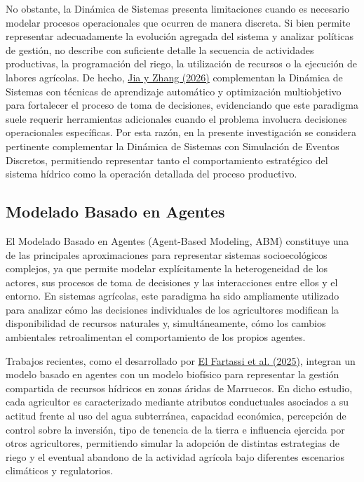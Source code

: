 \documentclass[12pt]{report}
\newcommand{\citeref}[2]{\hyperlink{ref:#1}{#2}}
\begin{document}
No obstante, la Dinámica de Sistemas presenta limitaciones cuando es necesario modelar procesos operacionales que ocurren de manera discreta. Si bien permite representar adecuadamente la evolución agregada del sistema y analizar políticas de gestión, no describe con suficiente detalle la secuencia de actividades productivas, la programación del riego, la utilización de recursos o la ejecución de labores agrícolas. De hecho, \citeref{jia2026}{Jia y Zhang (2026)} complementan la Dinámica de Sistemas con técnicas de aprendizaje automático y optimización multiobjetivo para fortalecer el proceso de toma de decisiones, evidenciando que este paradigma suele requerir herramientas adicionales cuando el problema involucra decisiones operacionales específicas. Por esta razón, en la presente investigación se considera pertinente complementar la Dinámica de Sistemas con Simulación de Eventos Discretos, permitiendo representar tanto el comportamiento estratégico del sistema hídrico como la operación detallada del proceso productivo.

\subsection{Modelado Basado en Agentes}

El Modelado Basado en Agentes (Agent-Based Modeling, ABM) constituye una de las principales aproximaciones para representar sistemas socioecológicos complejos, ya que permite modelar explícitamente la heterogeneidad de los actores, sus procesos de toma de decisiones y las interacciones entre ellos y el entorno. En sistemas agrícolas, este paradigma ha sido ampliamente utilizado para analizar cómo las decisiones individuales de los agricultores modifican la disponibilidad de recursos naturales y, simultáneamente, cómo los cambios ambientales retroalimentan el comportamiento de los propios agentes.

Trabajos recientes, como el desarrollado por \citeref{elfartassi2025}{El Fartassi et al. (2025)}, integran un modelo basado en agentes con un modelo biofísico para representar la gestión compartida de recursos hídricos en zonas áridas de Marruecos. En dicho estudio, cada agricultor es caracterizado mediante atributos conductuales asociados a su actitud frente al uso del agua subterránea, capacidad económica, percepción de control sobre la inversión, tipo de tenencia de la tierra e influencia ejercida por otros agricultores, permitiendo simular la adopción de distintas estrategias de riego y el eventual abandono de la actividad agrícola bajo diferentes escenarios climáticos y regulatorios.
\end{document}
